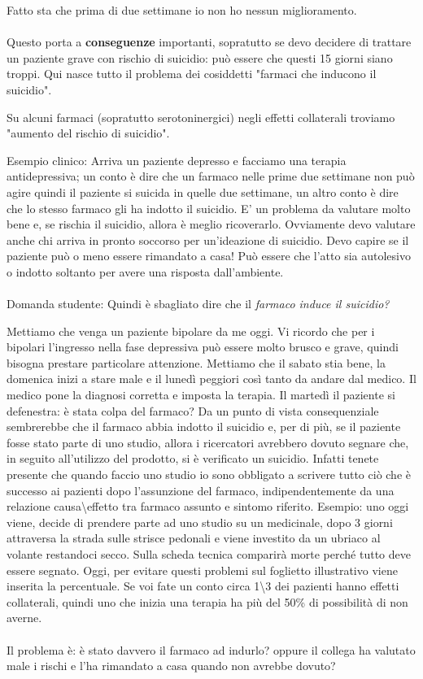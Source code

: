 \begin{itemize}
Fatto sta che prima di due settimane io non ho nessun miglioramento.
\\\\
Questo porta a \textbf{conseguenze} importanti, sopratutto se devo
decidere di trattare un paziente grave con rischio di suicidio: può
essere che questi 15 giorni siano troppi. Qui nasce tutto il problema
dei cosiddetti "farmaci che inducono il suicidio".

Su alcuni farmaci (sopratutto serotoninergici) negli effetti collaterali
troviamo "aumento del rischio di suicidio".

Esempio clinico: Arriva un paziente depresso e facciamo una terapia
antidepressiva; un conto è dire che un farmaco nelle prime due settimane
non può agire quindi il paziente si suicida in quelle due settimane, un
altro conto è dire che lo stesso farmaco gli ha indotto il suicidio. E'
un problema da valutare molto bene e, se rischia il suicidio, allora è
meglio ricoverarlo. Ovviamente devo valutare anche chi arriva in pronto
soccorso per un'ideazione di suicidio. Devo capire se il paziente può o
meno essere rimandato a casa! Può essere che l'atto sia autolesivo o
indotto soltanto per avere una risposta dall'ambiente.
\\\\
Domanda studente: Quindi è sbagliato dire che il \emph{farmaco induce il
suicidio?}

Mettiamo che venga un paziente bipolare da me oggi. Vi ricordo che per i
bipolari l'ingresso nella fase depressiva può essere molto brusco e
grave, quindi bisogna prestare particolare attenzione. Mettiamo che il
sabato stia bene, la domenica inizi a stare male e il lunedì peggiori
così tanto da andare dal medico. Il medico pone la diagnosi corretta e
imposta la terapia. Il martedì il paziente si defenestra: è stata colpa
del farmaco? Da un punto di vista consequenziale sembrerebbe che il
farmaco abbia indotto il suicidio e, per di più, se il paziente fosse
stato parte di uno studio, allora i ricercatori avrebbero dovuto segnare
che, in seguito all'utilizzo del prodotto, si è verificato un suicidio.
Infatti tenete presente che quando faccio uno studio io sono obbligato a
scrivere tutto ciò che è successo ai pazienti dopo l'assunzione del
farmaco, indipendentemente da una relazione causa\textbackslash{}effetto
tra farmaco assunto e sintomo riferito. Esempio: uno oggi viene, decide
di prendere parte ad uno studio su un medicinale, dopo 3 giorni
attraversa la strada sulle strisce pedonali e viene investito da un
ubriaco al volante restandoci secco. Sulla scheda tecnica comparirà
morte perché tutto deve essere segnato. Oggi, per evitare questi
problemi sul foglietto illustrativo viene inserita la percentuale. Se
voi fate un conto circa 1\textbackslash{}3 dei pazienti hanno effetti
collaterali, quindi uno che inizia una terapia ha più del 50\% di
possibilità di non averne.
\\\\
Il problema è: è stato davvero il farmaco ad indurlo? oppure il collega
ha valutato male i rischi e l'ha rimandato a casa quando non avrebbe
dovuto?


\end{itemize}
